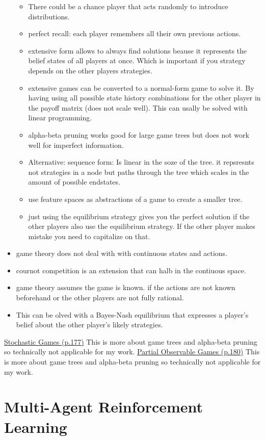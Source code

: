 \begin{itemize}[noitemsep,nolistsep]
\begin{itemize}[noitemsep,nolistsep]
		\item There could be a chance player that acts randomly to introduce distributions.
		\item perfect recall: each player remembers all their own previous actions.
		\item extensive form allows to always find solutions beause it represents the belief states of all players at once. Which is important if you strategy depends on the other players strategies.
		\item extensive games can be converted to a normal-form game to solve it. By having using all possible state history combinations for the other player in the payoff matrix (does not scale well). This can usally be solved with linear programming.
		\item alpha-beta pruning works good for large game trees but does not work well for imperfect information.
		\item Alternative: sequence form: Is linear in the soze of the tree. it repsresnts not strategies in a node but paths through the tree which scales in the amount of possible endstates.
		\item use feature spaces as abstractions of a game to create a smaller tree.
		\item just using the equilibrium strategy gives you the perfect solution if the other players also use the equilibrium strategy. If the other player makes mistake you need to capitalize on that.
	\end{itemize}
	\item game theory does not deal with with continuous states and actions. 
	\item cournot competition is an extension that can halb in the contiuous space.
	\item game theory assumes the game is known. if the actions are not known beforehand or the other players are not fully rational.
	\item This can be olved with a Bayes-Nash equilibrium that expresses a player's belief about the other player's likely strategies.
\end{itemize}

\underline{Stochastic Games (p.177)}
This is more about game trees and alpha-beta pruning so technically not applicable for my work.
\underline{Partial Observable Games (p.180)}
This is more about game trees and alpha-beta pruning so technically not applicable for my work.

\section{Multi-Agent Reinforcement Learning}
